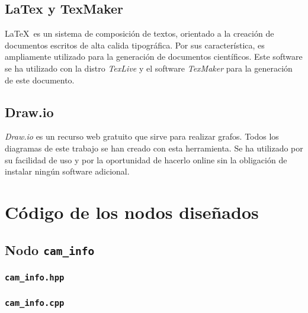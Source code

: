 \section{LaTex y TexMaker}

\LaTeX \, es un sistema de composición de textos, orientado a la creación de documentos escritos de alta calida tipográfica. Por sus característica, es ampliamente utilizado para la generación de documentos científicos. Este software se ha utilizado con la distro \textit{TexLive} y el software \textit{TexMaker} para la generación de este documento.\\

\section{Draw.io}

\textit{Draw.io} es un recurso web gratuito que sirve para realizar grafos. Todos los diagramas de este trabajo se han creado con esta herramienta. Se ha utilizado por su facilidad de uso y por la oportunidad de hacerlo online sin la obligación de instalar ningún software adicional.\\

\chapter{Código de los nodos diseñados}

\section{Nodo \texttt{cam\_info}}

\subsection*{\texttt{cam\_info.hpp}}

\lstset{style=cppstyle}
\vspace{0.2cm}

\vspace{0.4cm}

\subsection*{\texttt{cam\_info.cpp}}

\vspace{0.2cm}

\vspace{0.4cm}

